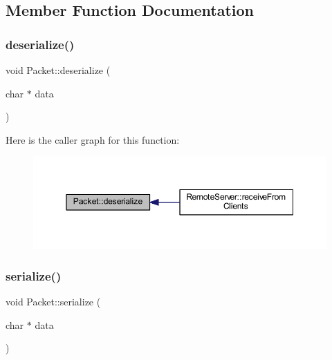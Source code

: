 \subsection{Member Function Documentation}
\mbox{\label{class_packet_a2eee3a176f3b4255a615c5ce01fc9fc3}} 
\subsubsection{\texorpdfstring{deserialize()}{deserialize()}}
{\footnotesize\ttfamily void Packet\+::deserialize (\begin{DoxyParamCaption}\item[{char $\ast$}]{data }\end{DoxyParamCaption})\hspace{0.3cm}{\ttfamily [inline]}}

Here is the caller graph for this function\+:
\nopagebreak
\begin{figure}[H]
\begin{center}
\leavevmode
\includegraphics[width=350pt]{class_packet_a2eee3a176f3b4255a615c5ce01fc9fc3_icgraph}
\end{center}
\end{figure}
\mbox{\label{class_packet_a70dba5b27e4b75e68a5b3c36879f62c5}} 
\subsubsection{\texorpdfstring{serialize()}{serialize()}}
{\footnotesize\ttfamily void Packet\+::serialize (\begin{DoxyParamCaption}\item[{char $\ast$}]{data }\end{DoxyParamCaption})\hspace{0.3cm}{\ttfamily [inline]}}

